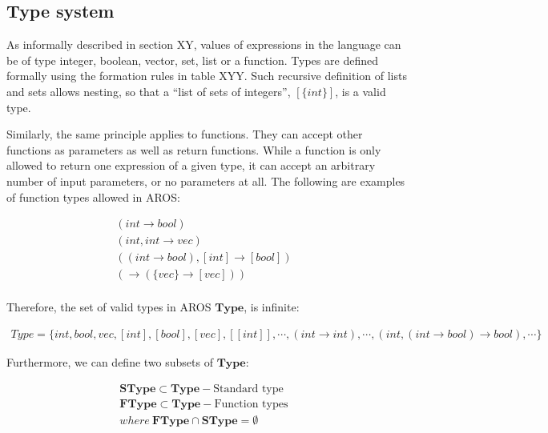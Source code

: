 \subsection{Type system}
\label{sec:design:formal:type-system}
\par
As informally described in section XY, values of expressions in the language can be of type integer, boolean, vector, set, list or a function. Types are defined formally using the formation rules in table XYY. Such recursive definition of lists and sets allows nesting, so that a ``list of sets of integers'', $[ \{int\} ]$, is a valid type. 

\par 
Similarly, the same principle applies to functions. They can accept other functions as parameters as well as return functions. While a function is only allowed to return one expression of a given type, it can accept an arbitrary number of input parameters, or no parameters at all. The following are examples of function types allowed in AROS:


\begin{align*}
    & (int \rightarrow bool)\\
    & (int, int \rightarrow vec)\\
    & ((int \rightarrow bool), [int] \rightarrow [bool])\\
    & ( \rightarrow (\{vec\} \rightarrow [vec]))\\
    &&&
\end{align*}

\par
Therefore, the set of valid types in AROS $\textbf{Type}$, is infinite: 

\begin{align*}
    Type = \{ int, bool, vec, [int], [bool], [vec], [[int]], \cdots, (int \rightarrow int), \cdots, (int,(int \rightarrow bool) \rightarrow bool), \cdots \}
\end{align*}

\newblock
\par
Furthermore, we can define two subsets of $\textbf{Type}$:

\begin{align*}
    & \mathbf{SType} \subset \mathbf{Type} - \text{Standard type} \\
    & \mathbf{FType} \subset \mathbf{Type} - \text{Function types} \\  
    & where \: \mathbf{FType} \cap \mathbf{SType} = \emptyset \\
    &&&
\end{align*}


